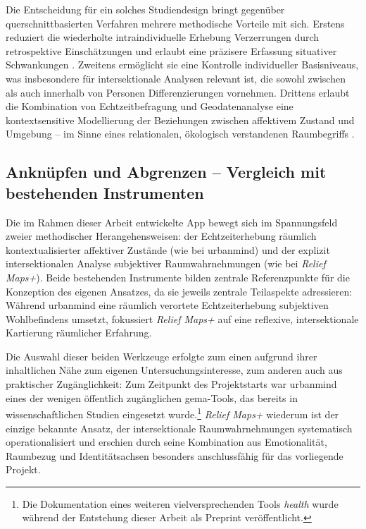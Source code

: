 Die Entscheidung für ein solches Studiendesign bringt gegenüber querschnittbasierten Verfahren mehrere methodische Vorteile mit sich. Erstens reduziert die wiederholte intraindividuelle Erhebung Verzerrungen durch retrospektive Einschätzungen und erlaubt eine präzisere Erfassung situativer Schwankungen \parencite{randallDevelopmentTrialMobile2013}. Zweitens ermöglicht sie eine Kontrolle individueller Basisniveaus, was insbesondere für intersektionale Analysen relevant ist, die sowohl zwischen als auch innerhalb von Personen Differenzierungen vornehmen. Drittens erlaubt die Kombination von Echtzeitbefragung und Geodatenanalyse eine kontextsensitive Modellierung der Beziehungen zwischen affektivem Zustand und Umgebung -- im Sinne eines relationalen, ökologisch verstandenen Raumbegriffs \parencite{mascherekMeadowsAsphaltRoad2025}.


\subsection{Anknüpfen und Abgrenzen -- Vergleich mit bestehenden Instrumenten}

Die im Rahmen dieser Arbeit entwickelte App bewegt sich im Spannungsfeld zweier methodischer Herangehensweisen: der Echtzeiterhebung räumlich kontextualisierter affektiver Zustände (wie bei \gls{urbanmind}) und der explizit intersektionalen Analyse subjektiver Raumwahrnehmungen (wie bei \textit{Relief Maps+}). Beide bestehenden Instrumente bilden zentrale Referenzpunkte für die Konzeption des eigenen Ansatzes, da sie jeweils zentrale Teilaspekte adressieren: Während \gls{urbanmind} eine räumlich verortete Echtzeiterhebung subjektiven Wohlbefindens umsetzt, fokussiert \textit{Relief Maps+} auf eine reflexive, intersektionale Kartierung räumlicher Erfahrung.

Die Auswahl dieser beiden Werkzeuge erfolgte zum einen aufgrund ihrer inhaltlichen Nähe zum eigenen Untersuchungsinteresse, zum anderen auch aus praktischer Zugänglichkeit: Zum Zeitpunkt des Projektstarts war \gls{urbanmind} eines der wenigen öffentlich zugänglichen \acrshort{gema}-Tools, das bereits in wissenschaftlichen Studien eingesetzt wurde.\footnote{Die Dokumentation eines weiteren vielversprechenden Tools \textit{\acrfull{health}} \parencite{wrayHealthyEnvironmentsActive2025} wurde während der Entstehung dieser Arbeit als Preprint veröffentlicht.} \textit{Relief Maps+} wiederum ist der einzige bekannte Ansatz, der intersektionale Raumwahrnehmungen systematisch operationalisiert und erschien durch seine Kombination aus Emotionalität, Raumbezug und Identitätsachsen besonders anschlussfähig für das vorliegende Projekt.

